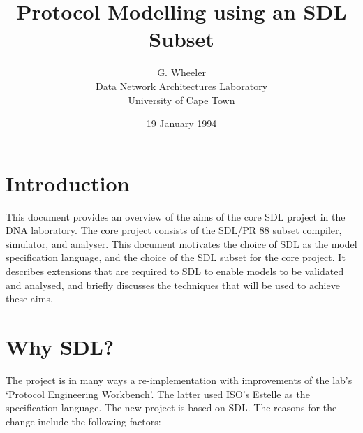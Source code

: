 

\title{Protocol Modelling using an SDL Subset}
\author{G. Wheeler\\
Data Network Architectures Laboratory\\
University of Cape Town}
\date{19 January 1994}
\maketitle

\section{Introduction}

This document provides an overview of the aims of the core SDL project in the
DNA laboratory. The core project consists of the SDL/PR 88 subset compiler,
simulator, and analyser. This document motivates the choice of SDL as the
model specification language, and the choice of the SDL subset for the core
project. It describes extensions that are required to SDL to enable models
to be validated and analysed, and briefly discusses the techniques that 
will be used to achieve these aims.

\section{Why SDL?}
\label{whySDL}


The project is in many ways a re-implementation with improvements of the
lab's `Protocol Engineering Workbench'. The latter used ISO's Estelle as the
specification language. The new project is based on SDL. The reasons for
the change include the following factors:

